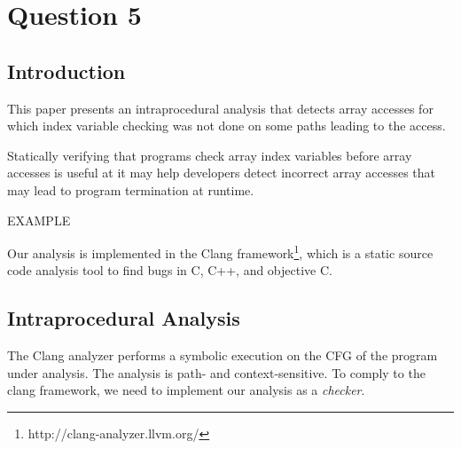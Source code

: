 \section*{Question 5}

\subsection*{Introduction}
This paper presents an intraprocedural analysis that detects
array accesses for which index variable checking was not done
on some paths leading to the access.

Statically verifying that programs check array index variables
before array accesses is useful at it may help developers detect
incorrect array accesses that may lead to program termination
at runtime.

EXAMPLE

Our analysis is implemented in the
Clang framework\footnote{http://clang-analyzer.llvm.org/},
which is a static source code analysis tool to find bugs in
C, C++, and objective C.

\subsection*{Intraprocedural Analysis}
%
%

The Clang analyzer performs a symbolic execution on the CFG
of the program under analysis. The analysis is path- and
context-sensitive. To comply to the clang framework, we need
to implement our analysis as a \textit{checker}. 








